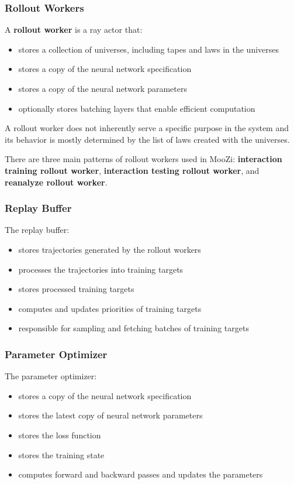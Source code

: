 \documentclass[12pt]{article}
\begin{document}
\subsubsection{Rollout Workers}
A \textbf{rollout worker} is a ray actor that:
\begin{itemize}
    \item stores a collection of universes, including tapes and laws in the universes
    \item stores a copy of the neural network specification
    \item stores a copy of the neural network parameters
    \item optionally stores batching layers that enable efficient computation
\end{itemize}

A rollout worker does not inherently serve a specific purpose in the system and its behavior is mostly determined by the list of laws created with the universes.

There are three main patterns of rollout workers used in MooZi:
\textbf{interaction training rollout worker},
\textbf{interaction testing rollout worker},
and \textbf{reanalyze rollout worker}.

\subsubsection{Replay Buffer}
The replay buffer:
\begin{itemize}
    \item stores trajectories generated by the rollout workers
    \item processes the trajectories into training targets
    \item stores processed training targets
    \item computes and updates priorities of training targets
    \item responsible for sampling and fetching batches of training targets
\end{itemize}

\subsubsection{Parameter Optimizer}
The parameter optimizer:
\begin{itemize}
    \item stores a copy of the neural network specification
    \item stores the latest copy of neural network parameters
    \item stores the loss function
    \item stores the training state
    \item computes forward and backward passes and updates the parameters
\end{itemize}
\end{document}
